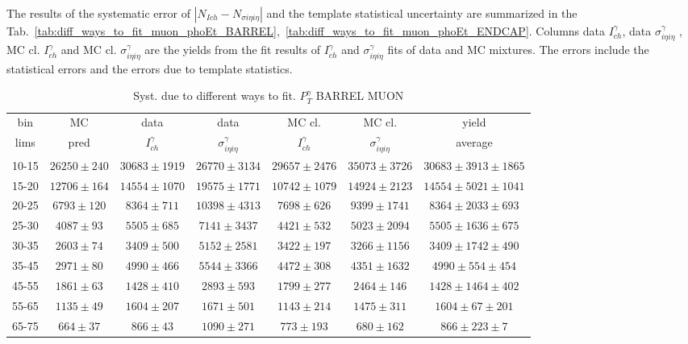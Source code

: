 The results of the systematic error of $|N_{Ich}-N_{\sigma i\eta i\eta}|$ and the template statistical uncertainty are summarized in the Tab.~\ref{tab:diff_ways_to_fit_muon_phoEt_BARREL},~\ref{tab:diff_ways_to_fit_muon_phoEt_ENDCAP}. Columns data $I_{ch}^{\gamma}$, data $\sigma_{i\eta i\eta}^\gamma$ , MC cl. $I_{ch}^{\gamma}$ and MC cl. $\sigma_{i\eta i\eta}^\gamma$  are the yields from the fit results of $I_{ch}^{\gamma}$ and $\sigma_{i\eta i\eta}^{\gamma}$ fits of data and MC mixtures. The errors include the statistical errors and the errors due to template statistics.

\begin{table}[h]
  \tiny
  \begin{center}
  \caption{Syst. due to different ways to fit. $P_T^{\gamma}$ BARREL MUON}
  \begin{tabular}{|c|c|c|c|c|c|c|}
    bin &  MC   & data  & data  & MC cl. & MC cl. & yield\\ 
    lims & pred & $I_{ch}^{\gamma}$ & $\sigma_{i\eta i\eta}^\gamma$  & $I_{ch}^{\gamma}$  & $\sigma_{i\eta i\eta}^\gamma$   & average \\ \hline
    10-15 & $26250\pm240$ & $30683\pm1919$ & $26770\pm3134$ & $29657\pm2476$ & $35073\pm3726$ &$30683\pm3913\pm1865$  \\ \hline
    15-20 & $12706\pm164$ & $14554\pm1070$ & $19575\pm1771$ & $10742\pm1079$ & $14924\pm2123$ &$14554\pm5021\pm1041$  \\ \hline
    20-25 & $6793\pm120$ & $8364\pm711$ & $10398\pm4313$ & $7698\pm626$ & $9399\pm1741$ &$8364\pm2033\pm693$  \\ \hline
    25-30 & $4087\pm93$ & $5505\pm685$ & $7141\pm3437$ & $4421\pm532$ & $5023\pm2094$ &$5505\pm1636\pm675$  \\ \hline
    30-35 & $2603\pm74$ & $3409\pm500$ & $5152\pm2581$ & $3422\pm197$ & $3266\pm1156$ &$3409\pm1742\pm490$  \\ \hline
    35-45 & $2971\pm80$ & $4990\pm466$ & $5544\pm3366$ & $4472\pm308$ & $4351\pm1632$ &$4990\pm554\pm454$  \\ \hline
    45-55 & $1861\pm63$ & $1428\pm410$ & $2893\pm593$ & $1799\pm277$ & $2464\pm146$ &$1428\pm1464\pm402$  \\ \hline
    55-65 & $1135\pm49$ & $1604\pm207$ & $1671\pm501$ & $1143\pm214$ & $1475\pm311$ &$1604\pm67\pm201$  \\ \hline
    65-75 & $664\pm37$ & $866\pm43$ & $1090\pm271$ & $773\pm193$ & $680\pm162$ &$866\pm223\pm7$  \\ \hline

\end{tabular}
\end{center}
\end{table}
